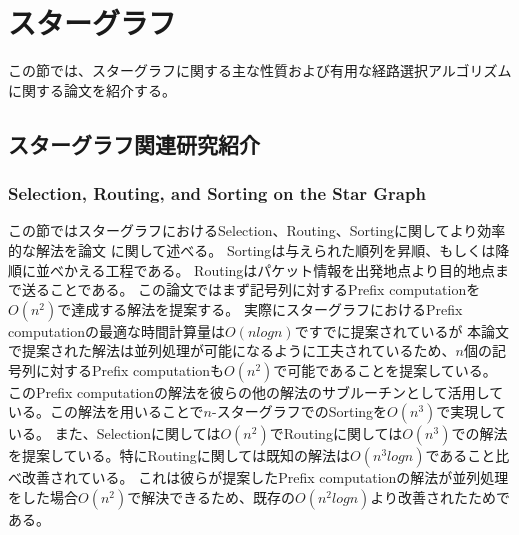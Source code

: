 \documentclass[11pt,a4j]{jsarticle}
\theoremstyle{plain}
\begin{document}
\newpage


\newpage




\newpage








\section{スターグラフ}
この節では、スターグラフに関する主な性質および有用な経路選択アルゴリズムに関する論文を紹介する。








\subsection{スターグラフ関連研究紹介}
\subsubsection{Selection, Routing, and Sorting on the Star Graph}
この節ではスターグラフにおけるSelection、Routing、Sortingに関してより効率的な解法を論文 \cite{star-routing}に関して述べる。\newline
Sortingは与えられた順列を昇順、もしくは降順に並べかえる工程である。\newline
Routingはパケット情報を出発地点より目的地点まで送ることである。\newline
この論文ではまず記号列に対するPrefix computationを$O(n^2)$で達成する解法を提案する。
実際にスターグラフにおけるPrefix computationの最適な時間計算量は$O(nlogn)$ですでに提案されている\cite{star-optimal-prefix-computation}が
本論文で提案された解法は並列処理が可能になるように工夫されているため、$n$個の記号列に対するPrefix computationも$O(n^2)$で可能であることを提案している。
このPrefix computationの解法を彼らの他の解法のサブルーチンとして活用している。この解法を用いることで$n$-スターグラフでのSortingを$O(n^3)$で実現している。
また、Selectionに関しては$O(n^2)$でRoutingに関しては$O(n^3)$での解法を提案している。特にRoutingに関しては既知の解法は$O(n^3logn)$であること比べ改善されている。
これは彼らが提案したPrefix computationの解法が並列処理をした場合$O(n^2)$で解決できるため、既存の$O(n^2logn)$より改善されたためである。
\end{document}
